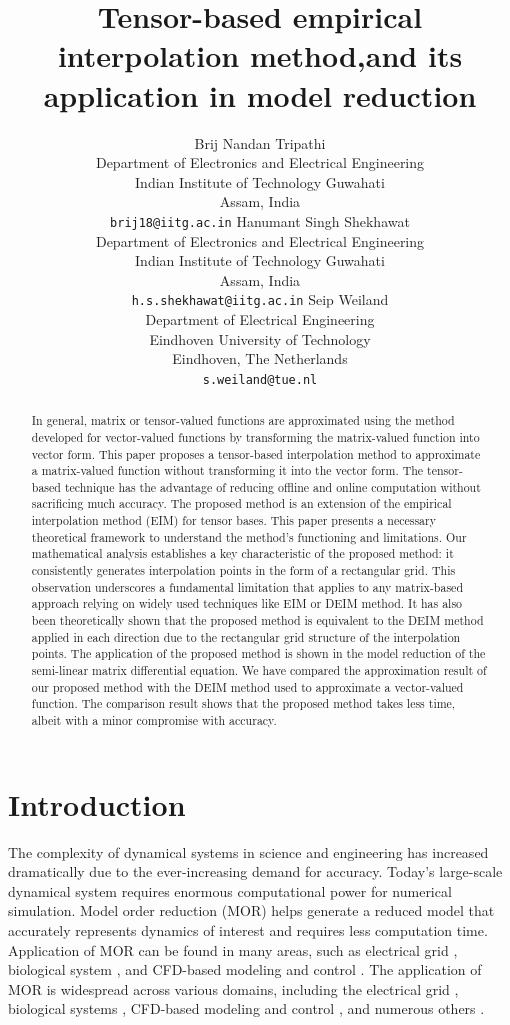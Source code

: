 \documentclass{article}
\title{Tensor-based empirical interpolation method,\newline and its application in model reduction}
\author{
Brij Nandan Tripathi \\
Department of Electronics and Electrical Engineering\\
Indian Institute of Technology Guwahati\\
Assam, India \\
\texttt{brij18@iitg.ac.in}
\And
Hanumant Singh Shekhawat \\
Department of Electronics and Electrical Engineering\\
Indian Institute of Technology Guwahati\\
Assam, India \\
\texttt{h.s.shekhawat@iitg.ac.in}
\And
Seip Weiland \\
Department of Electrical Engineering\\
Eindhoven University of Technology\\
Eindhoven, The Netherlands \\
\texttt{s.weiland@tue.nl}
}
\begin{document}
\maketitle
\begin{abstract}
In general, matrix or tensor-valued functions are approximated using the method developed for vector-valued functions by transforming the matrix-valued function into vector form. This paper proposes a tensor-based interpolation method to approximate a matrix-valued function without transforming it into the vector form. The tensor-based technique has the advantage of reducing offline and online computation without sacrificing much accuracy. The proposed method is an extension of the empirical interpolation method (EIM) for tensor bases. This paper presents a necessary theoretical framework to understand the method's functioning and limitations. Our mathematical analysis establishes a key characteristic of the proposed method: it consistently generates interpolation points in the form of a rectangular grid. This observation underscores a fundamental limitation that applies to any matrix-based approach relying on widely used techniques like EIM or DEIM method. It has also been theoretically shown that the proposed method is equivalent to the DEIM method applied in each direction due to the rectangular grid structure of the interpolation points. The application of the proposed method is shown in the model reduction of the semi-linear matrix differential equation. We have compared the approximation result of our proposed method with the DEIM method used to approximate a vector-valued function. The comparison result shows that the proposed method takes less time, albeit with a minor compromise with accuracy.
\end{abstract}



\section{Introduction}
The complexity of dynamical systems in science and engineering has increased dramatically due to the ever-increasing demand for accuracy. Today’s large-scale dynamical system requires enormous computational power for numerical simulation. Model order reduction (MOR) helps generate a reduced model that accurately represents dynamics of interest and requires less computation time. Application of MOR can be found in many areas, such as electrical grid  \cite{eletricalSmartgid}, biological system \cite{BiologicalSystem}, and CFD-based modeling and control \cite{CFDReduction}. The application of MOR is widespread across various domains, including the electrical grid \cite{eletricalSmartgid}, biological systems \cite{BiologicalSystem}, CFD-based modeling and control \cite{CFDReduction}, and numerous others \cite{ChoiEpistemic,cheung2023data,ChoiStressConstrained,CHOISpaceTime}.
\end{document}
